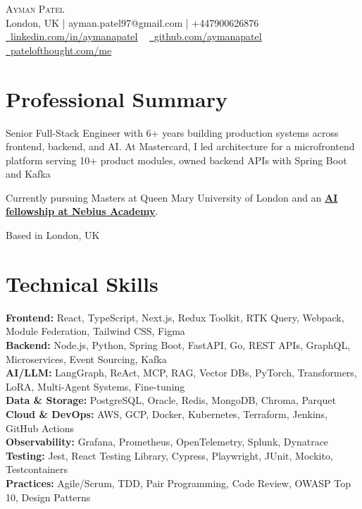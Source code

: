 \documentclass[letterpaper,11pt]{article}
\begin{document}
    \begin{center}
        {\Huge\scshape Ayman Patel}
        \\ London, UK | ayman.patel97@gmail.com | +447900626876 \\
        \small
        \href{https://linkedin.com/in/aymanapatel}{\raisebox{-0.2\height}\faLinkedin\ \underline{linkedin.com/in/aymanapatel}}  ~
        \href{https://github.com/aymanapatel}{\raisebox{-0.2\height}\faGithub\ \underline{github.com/aymanapatel}}  ~
        \href{https://patelofthought.com/me}{\raisebox{-0.2\height}\faGlobe\ \underline{patelofthought.com/me}}
    \end{center}

\section{Professional Summary}
\small
Senior Full-Stack Engineer with 6+ years building production systems across frontend, backend, and AI. At Mastercard, I led architecture for a microfrontend platform serving 10+ product modules, owned backend APIs with Spring Boot and Kafka

Currently pursuing Masters at Queen Mary University of London and an
\href{https://github.com/aymanapatel/nebius-project}{\textbf{AI fellowship at Nebius Academy}}.

Based in London, UK


\section{Technical Skills}
\vspace{-7pt}
\begin{itemize}[leftmargin=0.15in, label={}]\small{\item{
\textbf{Frontend:}{ React, TypeScript, Next.js, Redux Toolkit, RTK Query, Webpack, Module Federation, Tailwind CSS, Figma} \\
\textbf{Backend:}{ Node.js, Python, Spring Boot, FastAPI, Go, REST APIs, GraphQL, Microservices, Event Sourcing, Kafka} \\
\textbf{AI/LLM:}{ LangGraph, ReAct, MCP, RAG, Vector DBs, PyTorch, Transformers, LoRA, Multi-Agent Systems, Fine-tuning} \\
\textbf{Data \& Storage:}{ PostgreSQL, Oracle, Redis, MongoDB, Chroma, Parquet} \\
\textbf{Cloud \& DevOps:}{ AWS, GCP, Docker, Kubernetes, Terraform, Jenkins, GitHub Actions} \\
\textbf{Observability:}{ Grafana, Prometheus, OpenTelemetry, Splunk, Dynatrace} \\
\textbf{Testing:}{ Jest, React Testing Library, Cypress, Playwright, JUnit, Mockito, Testcontainers} \\
\textbf{Practices:}{ Agile/Scrum, TDD, Pair Programming, Code Review, OWASP Top 10, Design Patterns}
}}
\end{itemize}
\end{document}
